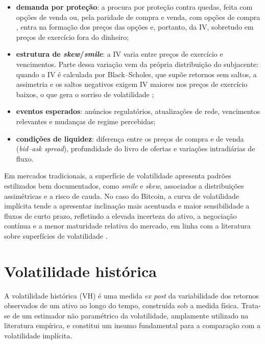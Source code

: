 \begin{itemize}
    \item \textbf{demanda por proteção}: a procura por proteção contra quedas,
          feita com opções de venda ou, pela paridade de compra e venda, com
          opções de compra \citep{hull2018options}, entra na formação dos
          preços das opções e, portanto, da IV, sobretudo em preços de
          exercício fora do dinheiro;
    \item \textbf{estrutura de \textit{skew}/\textit{smile}}: a IV varia entre
          preços de exercício e vencimentos. Parte dessa variação vem da
          própria distribuição do subjacente: quando a IV é calculada por
          Black--Scholes, que supõe retornos sem saltos, a assimetria e os
          saltos negativos exigem IV maiores nos preços de exercício baixos,
          o que gera o sorriso de volatilidade \citep{pan2006jumpRisk,
          gatheral2011volsurface};
    \item \textbf{eventos esperados}: anúncios regulatórios, atualizações de rede,
          vencimentos relevantes e mudanças de regime percebidas;
    \item \textbf{condições de liquidez}: diferença entre os preços de compra e
          de venda (\textit{bid--ask spread}), profundidade
          do livro de ofertas e variações intradiárias de fluxo.
\end{itemize}

Em mercados tradicionais, a superfície de volatilidade apresenta padrões
estilizados bem documentados, como \textit{smile} e \textit{skew}, associados a
distribuições assimétricas e a risco de cauda. No caso do Bitcoin, a curva de
volatilidade implícita tende a apresentar inclinação mais acentuada e maior
sensibilidade a fluxos de curto prazo, refletindo a elevada incerteza do ativo,
a negociação contínua e a menor maturidade relativa do mercado, em linha com a
literatura sobre superfícies de volatilidade \citep{gatheral2011volsurface,
bakshi2003dynamicsIV}.

\section{Volatilidade histórica}

A volatilidade histórica (VH) é uma medida \textit{ex post} da variabilidade
dos retornos observados de um ativo ao longo do tempo, construída sob a medida
física. Trata-se de um estimador não paramétrico da volatilidade, amplamente
utilizado na literatura empírica, e constitui um insumo fundamental para a
comparação com a volatilidade implícita.

